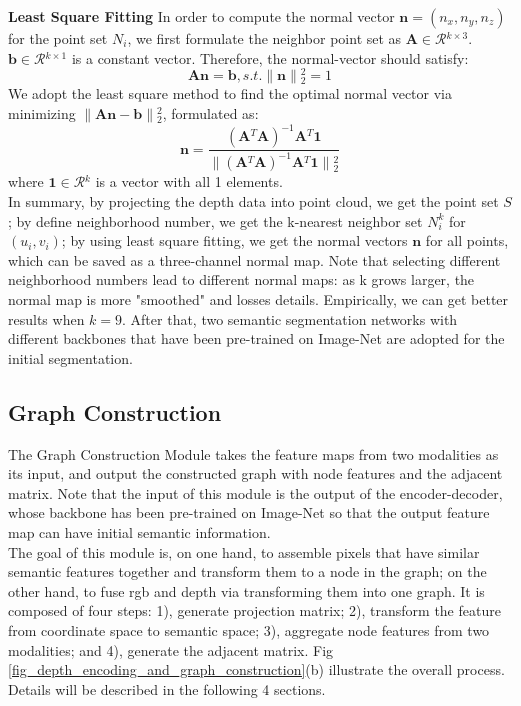 \documentclass[journal]{IEEEtran}
\begin{document}
    \textbf{Least Square Fitting}  In order to compute the normal vector ${\mathbf{n}}= (n_{x},n_{y},n_{z})$ for the point set $N_{i}$, we first formulate the neighbor point set as $\mathbf{A} \in \mathcal{R}{^{k \times 3}}$. $\mathbf{b} \in \mathcal{R}{^{k \times 1}}$ is a constant vector. Therefore, the normal-vector should satisfy:
    \begin{equation}
    \mathbf{A}{\mathbf{n}}=\mathbf{b}, s.t.\|{\mathbf{n}}\|{_2^2}=1
    \end{equation}
    We adopt the least square method to find the optimal normal vector via minimizing $ \|\mathbf{A}{\mathbf{n}}-\mathbf{b}\|{_2^2}$, formulated as:
    \begin{equation}
    \mathbf{n}=\frac{(\mathbf{A}{^T}\mathbf{A})^{-1}\mathbf{A}{^T}\mathbf{1}}{\|(\mathbf{A}{^T}\mathbf{A})^{-1}\mathbf{A}{^T}\mathbf{1}\|{_2^2}} 
    \end{equation}
    where $\mathbf{1}\in \mathcal{R}{^k}$ is a vector with all 1 elements. \\   

 
    In summary, by projecting the depth data into point cloud, we get the point set $S$; by define neighborhood number, we get the k-nearest neighbor set $N_i^k$ for $(u_i, v_i)$; by using least square fitting, we get the normal vectors $ \mathbf{n}$ for all points, which can be saved as a three-channel normal map. Note that selecting different neighborhood numbers lead to different normal maps: as k grows larger, the normal map is more "smoothed" and losses details. Empirically, we can get better results when $k=9$. After that, two semantic segmentation networks with different backbones that have been pre-trained on Image-Net are adopted for the initial segmentation.
    \\   

\subsection{Graph Construction}   \label{sec_sub_construct_graph}
   
    The Graph Construction Module takes the feature maps from two modalities as its input, and output the constructed graph with node features and the adjacent matrix. Note that the input of this module is the output of the encoder-decoder, whose backbone has been pre-trained on Image-Net so that the output feature map can have initial semantic information. \\   
    
  
    The goal of this module is, on one hand, to assemble pixels that have similar semantic features together and transform them to a node in the graph; on the other hand, to fuse rgb and depth via transforming them into one graph. It is composed of four steps: 1), generate projection matrix; 2), transform the feature from coordinate space to semantic space; 3), aggregate node features from two modalities; and 4), generate the adjacent matrix. Fig \ref{fig_depth_encoding_and_graph_construction}(b) illustrate the overall process. Details will be described in the following 4 sections. \\   
\end{document}
